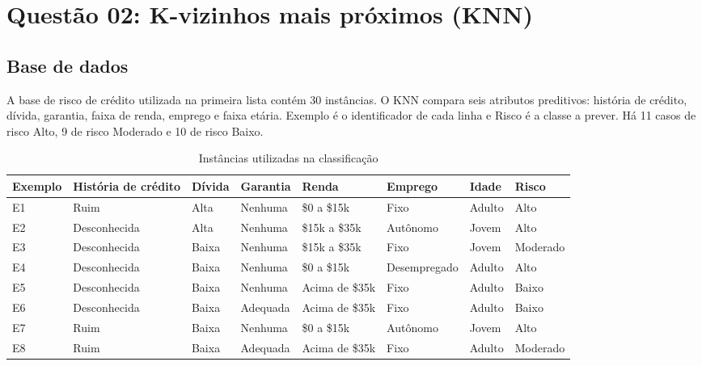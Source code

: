 \documentclass[12pt,a4paper]{article}
\begin{document}
\section{Questão 02: K-vizinhos mais próximos (KNN)}

\subsection{Base de dados}

A base de risco de crédito utilizada na primeira lista contém 30 instâncias. O KNN compara seis atributos preditivos: história de crédito, dívida, garantia, faixa de renda, emprego e faixa etária. Exemplo é o identificador de cada linha e Risco é a classe a prever. Há 11 casos de risco Alto, 9 de risco Moderado e 10 de risco Baixo.

\begin{table}[H]
    \centering
    \caption{Instâncias utilizadas na classificação}
    \setlength{\tabcolsep}{1.5pt}
    \renewcommand{\arraystretch}{0.92}
    \begin{tabular}{>{\raggedright\arraybackslash}p{1.60cm} >{\raggedright\arraybackslash}p{2.35cm} >{\raggedright\arraybackslash}p{1.25cm} >{\raggedright\arraybackslash}p{1.70cm} >{\raggedright\arraybackslash}p{2.65cm} >{\raggedright\arraybackslash}p{2.55cm} >{\raggedright\arraybackslash}p{1.20cm} >{\raggedright\arraybackslash}p{1.75cm}}
        \toprule
        \textbf{Exemplo} & \textbf{História de crédito} & \textbf{Dívida} & \textbf{Garantia} & \textbf{Renda} & \textbf{Emprego} & \textbf{Idade} & \textbf{Risco} \\
        \midrule
        E1 & Ruim & Alta & Nenhuma & \$0 a \$15k & Fixo & Adulto & Alto \\
        E2 & Desconhecida & Alta & Nenhuma & \$15k a \$35k & Autônomo & Jovem & Alto \\
        E3 & Desconhecida & Baixa & Nenhuma & \$15k a \$35k & Fixo & Jovem & Moderado \\
        E4 & Desconhecida & Baixa & Nenhuma & \$0 a \$15k & Desempregado & Adulto & Alto \\
        E5 & Desconhecida & Baixa & Nenhuma & Acima de \$35k & Fixo & Adulto & Baixo \\
        E6 & Desconhecida & Baixa & Adequada & Acima de \$35k & Fixo & Adulto & Baixo \\
        E7 & Ruim & Baixa & Nenhuma & \$0 a \$15k & Autônomo & Jovem & Alto \\
        E8 & Ruim & Baixa & Adequada & Acima de \$35k & Fixo & Adulto & Moderado \\

\end{tabular}
\end{table}
\end{document}
